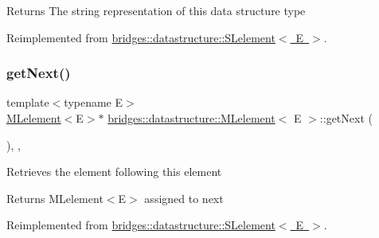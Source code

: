 \begin{DoxyReturn}{Returns}
The string representation of this data structure type 
\end{DoxyReturn}


Reimplemented from \mbox{\hyperlink{classbridges_1_1datastructure_1_1_s_lelement_a602156aacacd73d1faa365d68d8af31b}{bridges\+::datastructure\+::\+S\+Lelement$<$ E $>$}}.

\mbox{\label{classbridges_1_1datastructure_1_1_m_lelement_a47b417db0b948b6899eece572bef9274}} 
\subsubsection{\texorpdfstring{get\+Next()}{getNext()}\hspace{0.1cm}{\footnotesize\ttfamily [1/2]}}
{\footnotesize\ttfamily template$<$typename E$>$ \\
\mbox{\hyperlink{classbridges_1_1datastructure_1_1_m_lelement}{M\+Lelement}}$<$E$>$$\ast$ \mbox{\hyperlink{classbridges_1_1datastructure_1_1_m_lelement}{bridges\+::datastructure\+::\+M\+Lelement}}$<$ E $>$\+::get\+Next (\begin{DoxyParamCaption}{ }\end{DoxyParamCaption})\hspace{0.3cm}{\ttfamily [inline]}, {\ttfamily [override]}, {\ttfamily [virtual]}}

Retrieves the element following this element

\begin{DoxyReturn}{Returns}
M\+Lelement$<$\+E$>$ assigned to next 
\end{DoxyReturn}


Reimplemented from \mbox{\hyperlink{classbridges_1_1datastructure_1_1_s_lelement_ae43dd771d9ced7cb17f1d35f34cd9a42}{bridges\+::datastructure\+::\+S\+Lelement$<$ E $>$}}.

\mbox{\label{classbridges_1_1datastructure_1_1_m_lelement_a611b3e7d54fdfbc622004a50ca718e6e}} 
